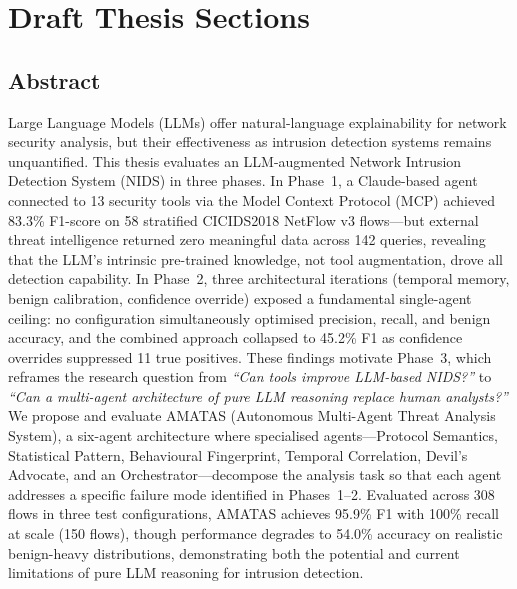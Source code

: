 \documentclass[12pt, a4paper, oneside]{report}
\begin{document}
\part{Draft Thesis Sections}
\label{part:draft}


\chapter*{Abstract}
\label{ch:abstract}

Large Language Models (LLMs) offer natural-language explainability for network
security analysis, but their effectiveness as intrusion detection systems remains
unquantified. This thesis evaluates an LLM-augmented Network Intrusion Detection
System (NIDS) in three phases. In Phase~1, a Claude-based agent connected to 13
security tools via the Model Context Protocol (MCP) achieved 83.3\% F1-score on
58 stratified CICIDS2018 NetFlow v3 flows---but external threat intelligence
returned zero meaningful data across 142 queries, revealing that the LLM's
intrinsic pre-trained knowledge, not tool augmentation, drove all detection
capability. In Phase~2, three architectural iterations (temporal memory, benign
calibration, confidence override) exposed a fundamental single-agent ceiling:
no configuration simultaneously optimised precision, recall, and benign accuracy,
and the combined approach collapsed to 45.2\% F1 as confidence overrides
suppressed 11 true positives. These findings motivate Phase~3, which reframes
the research question from \emph{``Can tools improve LLM-based NIDS?''} to
\emph{``Can a multi-agent architecture of pure LLM reasoning replace human
analysts?''} We propose and evaluate AMATAS (Autonomous Multi-Agent Threat
Analysis System), a six-agent architecture where specialised agents---Protocol
Semantics, Statistical Pattern, Behavioural Fingerprint, Temporal Correlation,
Devil's Advocate, and an Orchestrator---decompose the analysis task so that each
agent addresses a specific failure mode identified in Phases~1--2. Evaluated across
308 flows in three test configurations, AMATAS achieves 95.9\% F1 with 100\%
recall at scale (150 flows), though performance degrades to 54.0\% accuracy on
realistic benign-heavy distributions, demonstrating both the potential and current
limitations of pure LLM reasoning for intrusion detection.
\end{document}
